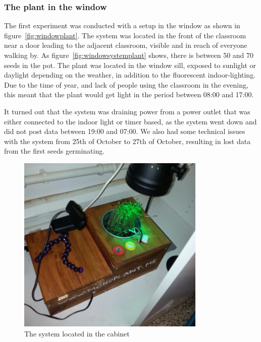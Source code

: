 \subsubsection*{The plant in the window}
The first experiment was conducted with a setup in the window as shown in figure~\ref{fig:windowplant}. The system was located in the front of the classroom near a door leading to the adjacent classroom, visible and in reach of everyone walking by. As figure~\ref{fig:windowsystemplant} shows, there is between 50 and 70 seeds in the pot. The plant was located in the window sill, exposed to sunlight or daylight depending on the weather, in addition to the fluorescent indoor-lighting. Due to the time of year, and lack of people using the classroom in the evening, this meant that the plant would get light in the period between 08:00 and 17:00.

It turned out that the system was draining power from a power outlet that was either connected to the indoor light or timer based, as the system went down and did not post data between 19:00 and 07:00. We also had some technical issues with the system from 25th of October to 27th of October, resulting in lost data from the first seeds germinating.

\begin{figure}
\centering
\includegraphics[width=0.8\textwidth]{img/empiricalsetting/cupboard.jpg}
\caption{The system located in the cabinet}
\label{fig:cabinetplant}
\end{figure}

